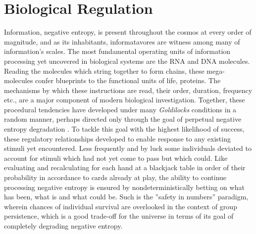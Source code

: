 
\section{Biological Regulation}
\label{sec:bioreg}
Information, \ie negative entropy, is present throughout the cosmos at every order of magnitude, and as its inhabitants, informatavores are witness among many of information's scales. The most fundamental operating units of information processing yet uncovered in biological systems are the RNA and DNA molecules. Reading the molecules which string together to form chains, these mega-molecules confer blueprints to the functional units of life, proteins. The mechanisms by which these instructions are read, \eg their order, duration, frequency etc., are a major component of modern biological investigation. Together, these procedural tendencies have developed under many \emph{Goldilocks} conditions in a random manner, perhaps directed only through the goal of perpetual negative entropy degradation \citep{england2013statistical}. To tackle this goal with the highest likelihood of success, these regulatory relationships developed to enable response to any existing stimuli yet encountered. Less frequently and by luck some individuals deviated to account for stimuli which had not yet come to pass but which could. Like evaluating and recalculating for each hand at a blackjack table in order of their probability in accordance to cards already at play, the ability to continue processing negative entropy is ensured by nondeterministically betting on what has been, what is and what could be. Such is the ''safety in numbers'' paradigm, wherein chances of individual survival are overlooked in the context of group persistence, which is a good trade-off for the universe in terms of its goal of completely degrading negative entropy.

